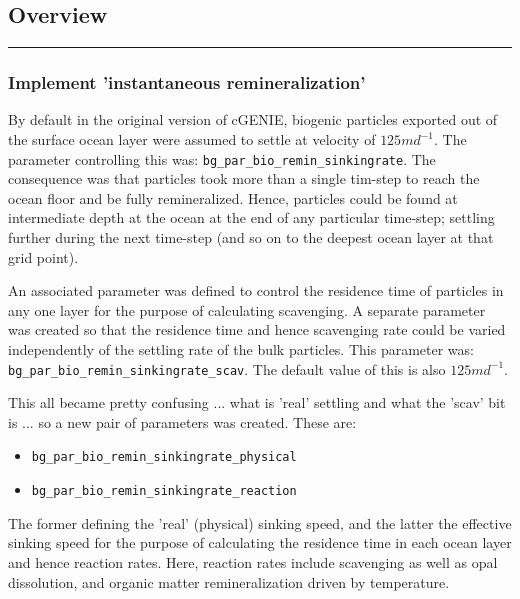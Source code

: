%
\subsection*{Overview}
\vspace{1mm}

\hfill \break

\noindent\rule{4cm}{0.5pt}
\subsubsection{Implement 'instantaneous remineralization'}
\vspace{1mm}

By default in the original version of cGENIE, biogenic particles exported out of the surface ocean layer were assumed to settle at velocity of \(125md^{-1}\). The parameter controlling this was: \break\texttt{bg\_par\_bio\_remin\_sinkingrate}. The consequence was that particles took more than a single tim-step to reach the ocean floor and be fully remineralized. Hence, particles could be found at intermediate depth at the ocean at the end of any particular time-step; settling further during the next time-step (and so on to the deepest ocean layer at that grid point).

An associated parameter was defined to control the residence time of particles in any one layer for the purpose of calculating scavenging. A separate parameter was created so that the residence time and hence scavenging rate could be varied independently of the settling rate of the bulk particles. This parameter was: \texttt{bg\_par\_bio\_remin\_sinkingrate\_scav}. The default value of this is also \(125md^{-1}\).

This all became pretty confusing ... what is 'real' settling and what the 'scav' bit is ... so a new pair of parameters was created. These are:
\vspace{1mm}
\begin{itemize}[noitemsep]
\item \texttt{bg\_par\_bio\_remin\_sinkingrate\_physical}
\item \texttt{bg\_par\_bio\_remin\_sinkingrate\_reaction}
\end{itemize}
\vspace{1mm}
The former defining the 'real' (physical) sinking speed, and the latter the effective sinking speed for the purpose of calculating the residence time in each ocean layer and hence reaction rates. Here, reaction rates include scavenging as well as opal dissolution, and organic matter remineralization driven by temperature.

